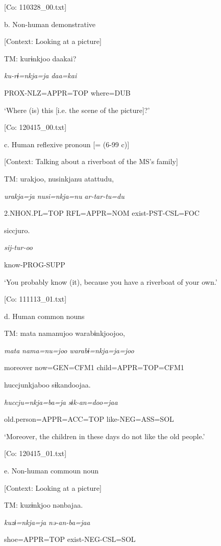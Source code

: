       [Co: 110328\_00.txt]

  b.  Non-human demonstrative

    [Context: Looking at a picture]

    TM:  kurɨnkjoo  daakai?

      \textit{ku-rɨ=nkja=ja}  \textit{daa=kai}

      PROX-NLZ=APPR=TOP  where=DUB

      ‘Where (is) this [i.e. the scene of the picture]?’

      [Co: 120415\_00.txt]

  c.  Human reflexive pronoun [= (6-99 c)]

    [Context: Talking about a riverboat of the MS’s family]

    TM:  urakjoo,  nusinkjanu  atattudu,

      \textit{urakja=ja}  \textit{nusi=nkja=nu}  \textit{ar-tar-tu=du}

      2.NHON.PL=TOP  RFL=APPR=NOM  exist-PST-CSL=FOC

      siccjuro.

      \textit{sij-tur-oo}

      know-PROG-SUPP

      ‘You probably know (it), because you have a riverboat of your own.’

      [Co: 111113\_01.txt]

  d.  Human common nouns

    TM:  mata  namanujoo  warabɨnkjoojoo,

      \textit{mata}  \textit{nama=nu=joo}  \textit{warabɨ=nkja=ja=joo}

      moreover  now=GEN=CFM1  child=APPR=TOP=CFM1

      huccjunkjaboo  sɨkandoojaa.

      \textit{huccju=nkja=ba=ja}  \textit{sɨk-an=doo=jaa}

      old.person=APPR=ACC=TOP  like-NEG=ASS=SOL

      ‘Moreover, the children in these days do not like the old people.’

      [Co: 120415\_01.txt]

  e.  Non-human commoun noun

    [Context: Looking at a picture]

    TM:  kuzɨnkjoo  nənbajaa.

      \textit{kuzɨ=nkja=ja}  \textit{nə-an-ba=jaa}

      shoe=APPR=TOP  exist-NEG-CSL=SOL

